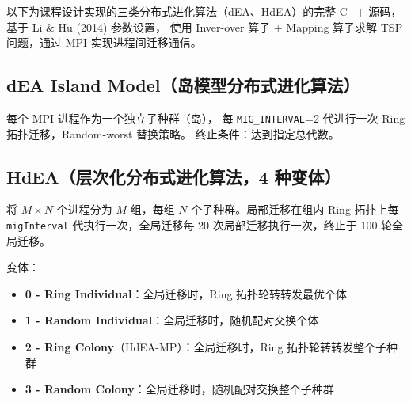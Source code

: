 以下为课程设计实现的三类分布式进化算法（dEA、HdEA）的完整 C++ 源码，
基于 Li \& Hu (2014) 参数设置，
使用 Inver-over 算子 + Mapping 算子求解 TSP 问题，通过 MPI 实现进程间迁移通信。

\subsection{dEA Island Model（岛模型分布式进化算法）}

\noindent 每个 MPI 进程作为一个独立子种群（岛），
每 \texttt{MIG\_INTERVAL}=2 代进行一次 Ring 拓扑迁移，Random-worst 替换策略。
终止条件：达到指定总代数。



\clearpage
\subsection{HdEA（层次化分布式进化算法，4 种变体）}

\noindent 将 $M\times N$ 个进程分为 $M$ 组，每组 $N$ 个子种群。局部迁移在组内 Ring 拓扑上每 \texttt{migInterval} 代执行一次，全局迁移每 20 次局部迁移执行一次，终止于 100 轮全局迁移。

变体：
\begin{itemize}
  \item \textbf{0 - Ring Individual}：全局迁移时，Ring 拓扑轮转转发最优个体
  \item \textbf{1 - Random Individual}：全局迁移时，随机配对交换个体
  \item \textbf{2 - Ring Colony}（HdEA-MP）：全局迁移时，Ring 拓扑轮转转发整个子种群
  \item \textbf{3 - Random Colony}：全局迁移时，随机配对交换整个子种群
\end{itemize}


